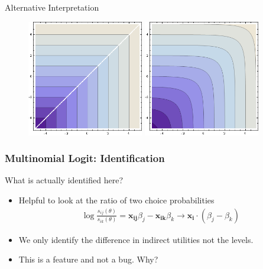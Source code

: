 \documentclass[xcolor=pdftex,dvipsnames,table,mathserif]{beamer}
\begin{document}
\begin{frame}{Alternative Interpretation}
\begin{figure}[htbp]
\begin{center}
\includegraphics[width=2in]{resources/hardmax.png}
\includegraphics[width=2in]{resources/softmax.png}
\end{center}
\end{figure}
\end{frame}

\begin{frame}
\frametitle{Multinomial Logit: Identification}
What is actually identified here?
\begin{itemize}
\item Helpful to look at the ratio of two choice probabilities
\begin{eqnarray*}
\log \frac{s_{ij}(\theta)}{s_{ik}(\theta)} = \mathbf{x_{ij}} \beta_j - \mathbf{x_{ik}} \beta_k \rightarrow  \mathbf{x_i}\cdot(\beta_j - \beta_k)
\end{eqnarray*}
\item We only identify the \alert{difference in indirect utilities} not the levels.
\item This is a feature and not a bug. Why?
\end{itemize}
\end{frame}
\end{document}
